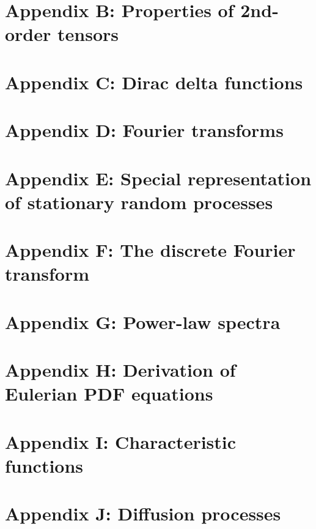 \documentclass[oneside]{book}
\numberwithin{equation}{section}
\begin{document}
\section{Appendix B: Properties of 2nd-order tensors}

\section{Appendix C: Dirac delta functions}

\section{Appendix D: Fourier transforms}

\section{Appendix E: Special representation of stationary random processes}

\section{Appendix F: The discrete Fourier transform}

\section{Appendix G: Power-law spectra}

\section{Appendix H: Derivation of Eulerian PDF equations}

\section{Appendix I: Characteristic functions}

\section{Appendix J: Diffusion processes}




\printbibliography[heading=bibintoc]
	
\end{document}
